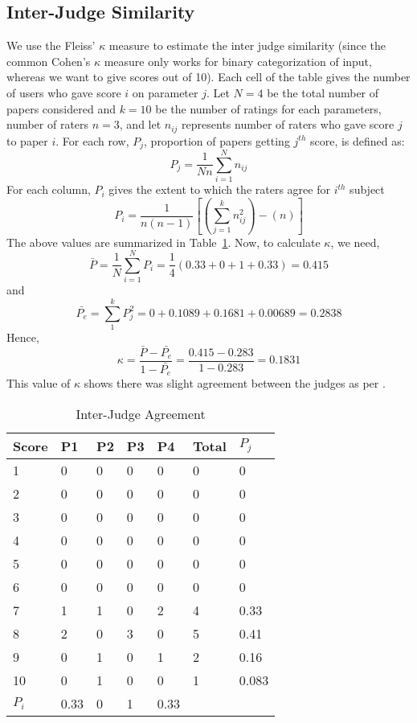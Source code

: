 \subsection{Inter-Judge Similarity}
We use the Fleiss' $\kappa$ measure \cite{kappa} to estimate the inter judge similarity
(since the common Cohen's $\kappa$ measure only works for binary categorization
of input, whereas we want to give scores out of 10).
Each cell of the table gives the number of users who gave score $i$ on 
parameter $j$. Let $N = 4$ be the total number of papers considered
and $k = 10$ be the number of ratings for each parameters, number of raters $n = 3$, 
and let $n_{ij}$
represents number of raters who gave score $j$ to paper $i$.
For each row, $P_j$, proportion of papers getting $j^{th}$ score, is defined as:
\[
	P_j = \frac{1}{Nn} \sum_{i=1}^{N} n_{ij}
\]
For each column, $P_i$ gives the extent to which the raters agree for $i^{th}$ subject
\[
	P_i = \frac{1}{n(n-1)} \left[ \left( \sum_{j=1}^{k} n_{ij}^{2} \right) - \left( n \right) \right]
\]
The above values are summarized in Table~\ref{tbl1:kappa}.
Now, to calculate $\kappa$, we need,
\[
	\bar{P} = \frac{1}{N} \sum_{i=1}^{N} P_i = \frac{1}{4} \left( 0.33 + 0 + 1 + 0.33 \right) = 0.415
\]
and
\[
	\bar{P_e} = \sum_{1}^{k} P_j^2 = 0 + 0.1089 + 0.1681 + 0.00689 = 0.2838
\]
Hence, 
\[
	\kappa = \frac {\bar{P} - \bar{P_e}} {1 - \bar{P_e}} = \frac{0.415 - 0.283}{1 - 0.283} = 0.1831
\]
This value of $\kappa$ shows there was slight agreement between the judges as per \cite{kappa}.

\begin{table}
\begin{center}
\caption{Inter-Judge Agreement}
\begin{tabular}{| l || l | l | l | l || l | l |}
\hline
Score & P1 & P2 & P3 & P4 & Total & $P_j$\\ \hline
1 & 0 & 0 & 0 & 0 & 0 & 0 \\ 
2 & 0 & 0 & 0 & 0 & 0 & 0 \\
3 & 0 & 0 & 0 & 0 & 0 & 0 \\
4 & 0 & 0 & 0 & 0 & 0 & 0 \\
5 & 0 & 0 & 0 & 0 & 0 & 0 \\
6 & 0 & 0 & 0 & 0 & 0 & 0 \\
7 & 1 & 1 & 0 & 2 & 4 & 0.33 \\
8 & 2 & 0 & 3 & 0 & 5 & 0.41 \\
9 & 0 & 1 & 0 & 1 & 2 & 0.16 \\
10 & 0 & 1 & 0 & 0 & 1 & 0.083 \\ \hline
$P_i$ & 0.33 & 0 & 1 & 0.33 &  &  \\ \hline
\end{tabular}
\label{tbl1:kappa}
\end{center}
\end{table}	
